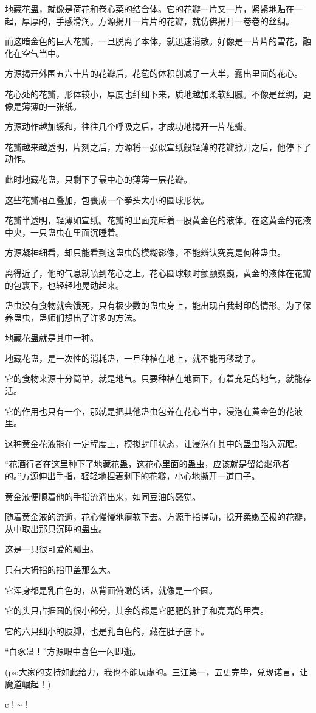 \begin{this_body}
地藏花蛊，就像是荷花和卷心菜的结合体。它的花瓣一片又一片，紧紧地贴在一起，厚厚的，手感滑润。方源揭开一片片的花瓣，就仿佛揭开一卷卷的丝绸。

而这暗金色的巨大花瓣，一旦脱离了本体，就迅速消散。好像是一片片的雪花，融化在空气当中。

方源揭开外围五六十片的花瓣后，花苞的体积削减了一大半，露出里面的花心。

花心处的花瓣，形体较小，厚度也纤细下来，质地越加柔软细腻。不像是丝绸，更像是薄薄的一张纸。

方源动作越加缓和，往往几个呼吸之后，才成功地揭开一片花瓣。

花瓣越来越透明，片刻之后，方源将一张似宣纸般轻薄的花瓣掀开之后，他停下了动作。

此时地藏花蛊，只剩下了最中心的薄薄一层花瓣。

这些花瓣相互叠加，包裹成一个拳头大小的圆球形状。

花瓣半透明，轻薄如宣纸。花瓣的里面充斥着一股黄金色的液体。在这黄金的花液中央，一只蛊虫在里面沉睡着。

方源凝神细看，却只能看到这蛊虫的模糊影像，不能辨认究竟是何种蛊虫。

离得近了，他的气息就喷到花心之上。花心圆球顿时颤颤巍巍，黄金的液体在花瓣的包裹下，也轻轻地晃动起来。

蛊虫没有食物就会饿死，只有极少数的蛊虫身上，能出现自我封印的情形。为了保养蛊虫，蛊师们想出了许多的方法。

地藏花蛊就是其中一种。

地藏花蛊，是一次性的消耗蛊，一旦种植在地上，就不能再移动了。

它的食物来源十分简单，就是地气。只要种植在地面下，有着充足的地气，就能存活。

它的作用也只有一个，那就是把其他蛊虫包养在花心当中，浸泡在黄金色的花液里。

这种黄金花液能在一定程度上，模拟封印状态，让浸泡在其中的蛊虫陷入沉眠。

“花酒行者在这里种下了地藏花蛊，这花心里面的蛊虫，应该就是留给继承者的。”方源伸出手指，轻轻地捏着剩下的花瓣，小心地撕开一道口子。

黄金液便顺着他的手指流淌出来，如同豆油的感觉。

随着黄金液的流逝，花心慢慢地瘪软下去。方源手指搓动，捻开柔嫩至极的花瓣，从中取出那只沉睡的蛊虫。

这是一只很可爱的瓢虫。

只有大拇指的指甲盖那么大。

它浑身都是乳白色的，从背面俯瞰的话，就像是一个圆。

它的头只占据圆的很小部分，其余的都是它肥肥的肚子和亮亮的甲壳。

它的六只细小的肢脚，也是乳白色的，藏在肚子底下。

“白豕蛊！”方源眼中喜色一闪即逝。

(ps:大家的支持如此给力，我也不能玩虚的。三江第一，五更完毕，兑现诺言，让魔道崛起！)

c！\~{}！

\end{this_body}

